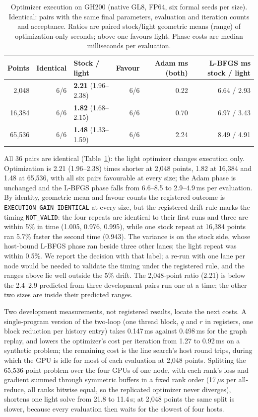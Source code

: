 \documentclass[11pt]{article}
\begin{document}
\begin{table}[t]
\centering
\caption{Optimizer execution on GH200 (native GL8, FP64, six formal seeds per size). Identical: pairs with the same final parameters, evaluation and iteration counts and acceptance. Ratios are paired stock/light geometric means (range) of optimization-only seconds; above one favours light. Phase costs are median milliseconds per evaluation.}
\label{tab:lbfgsgh200}
\small
\begin{tabular}{rrlrrr}
\toprule
Points & Identical & Stock / light & Favour & Adam ms (both) & L-BFGS ms stock / light\\
\midrule
2,048 & 6/6 & \textbf{2.21} (1.96--2.38) & 6/6 & 0.22 & 6.64 / 2.93\\
16,384 & 6/6 & \textbf{1.82} (1.68--2.15) & 6/6 & 0.70 & 6.97 / 3.43\\
65,536 & 6/6 & \textbf{1.48} (1.33--1.59) & 6/6 & 2.24 & 8.49 / 4.91\\
\bottomrule
\end{tabular}
\end{table}

All 36 pairs are identical (Table~\ref{tab:lbfgsgh200}): the light
optimizer changes execution only. Optimization is 2.21 (1.96--2.38) times
shorter at 2,048 points, 1.82 at 16,384 and 1.48 at 65,536, with all six
pairs favourable at every size; the Adam phase is unchanged and the L-BFGS
phase falls from 6.6--8.5 to 2.9--4.9\,ms per evaluation. By identity,
geometric mean and favour counts the registered outcome is
\texttt{EXECUTION\_GAIN\_IDENTICAL} at every size, but the registered drift
rule marks the timing \texttt{NOT\_VALID}: the four repeats are identical
to their first runs and three are within 5\% in time (1.005, 0.976, 0.995),
while one stock repeat at 16,384 points ran 5.7\% faster the second time
(0.943). The variance is on the stock side, whose host-bound L-BFGS phase
ran beside three other lanes; the light repeat was within 0.5\%. We report
the decision with that label; a re-run with one lane per node would be
needed to validate the timing under the registered rule, and the ranges
above lie well outside the 5\% drift. The 2,048-point ratio (2.21) is below
the 2.4--2.9 predicted from three development pairs run one at a time; the
other two sizes are inside their predicted ranges.

Two development measurements, not registered results, locate the next
costs. A single-program version of the two-loop (one thread block, $q$ and
$r$ in registers, one block reduction per history entry) takes 0.147\,ms
against 0.498\,ms for the graph replay, and lowers the optimizer's cost per
iteration from 1.27 to 0.92\,ms on a synthetic problem; the remaining cost
is the line search's host round trips, during which the GPU is idle for most
of each evaluation at 2,048 points. Splitting the 65,536-point problem over
the four GPUs of one node, with each rank's loss and gradient summed through
symmetric buffers in a fixed rank order (17\,$\mu$s per all-reduce, all
ranks bitwise equal, so the replicated optimizer never diverges), shortens
one light solve from 21.8 to 11.4\,s; at 2,048 points the same split is
slower, because every evaluation then waits for the slowest of four hosts.
\end{document}
